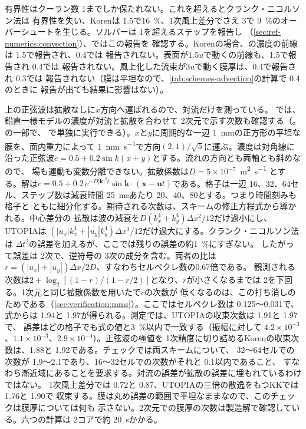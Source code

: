 有界性はクーラン数 1までしか保たれない。これを超えるとクランク・ニコルソン法は
有界性を失い、Korenは 1.5で\SI{16}{\percent}、1次風上差分でさえ 3で
\SI{9}{\percent}のオーバーシュートを生じる。ソルバーは 1を超えるステップを報告し
（\cref{sec:ref-numerics:convection}）、ではこの報告を
確認する。Korenの場合、の濃度の前線は 1.5で報告され、0.4では
報告されない。表面が$1.5u$で動くの前線も、1.5で報告され 0.4では
報告されない。風上化した流束が$3u$で動く膜厚は、0.4で報告され 0.3では
報告されない（膜は平坦なので、\cref{tab:schemes-advection}の計算で 0.4のときに
報告が出ても結果に影響はない）。

上の正弦波は拡散なしに$x$方向へ運ばれるので、対流だけを測っている。
では、鉛直一様モデルの濃度が対流と拡散を合わせて
2次元で示す次数も確認する（。の一部で、
で単独に実行できる）。$x$と$y$に周期的な一辺
\SI{1}{\milli\metre}の正方形の平坦な膜を、面内重力によって
\SI{1}{\milli\metre\per\second}で方向$(2,1)/\sqrt5$に運ぶ。濃度は対角線に
沿った正弦波$c = 0.5 + 0.2\sin k(x+y)$とする。流れの方向とも両軸とも斜めなので、
場も運動も変数分離できない。拡散係数は$D = 5\times10^{-7}$~\si{\metre\squared\per\second}
とする。解は$c = 0.5 + 0.2\,e^{-D|\mathbf k|^2t}\sin\mathbf
k\cdot(\mathbf x - \mathbf u t)$である。格子は一辺 16、32、64セル、ステップ数は減衰時間
\SI{25}{\milli\second}あたり 20、40、80とする。つまり時間刻みも格子と
ともに細分化する。期待される次数は、スキームの修正方程式から導かれる。中心差分の
拡散は波の減衰を$D(k_x^4+k_y^4)\Delta x^2/12$だけ過小にし、UTOPIAは
$(|u_x|k_x^4+|u_y|k_y^4)\Delta x^3/12$だけ過大にする。クランク・ニコルソン法は
$\Delta t^2$の誤差を加えるが、ここでは残りの誤差の約\SI{1}{\percent}にすぎない。
したがって誤差は 2次で、逆符号の 3次の成分を含む。両者の比は
$r = (|u_x|+|u_y|)\Delta x/2D$、すなわちセルペクレ数の$0.67$倍である。
観測される次数は$2 + \log_2[(1-r)/(1-r/2)]$となり、$r$が小さくなるまでは
2を下回る。1次元と同じ拡散係数を用いたで$c$の次数が
低くなるのは、この打ち消しのためである（\cref{sec:verification:mms}）。ここではセルペクレ数は
0.125～0.031で、式からは 1.94と 1.97が得られる。測定では、UTOPIAの収束次数は 1.91と 1.97で、
誤差はどの格子でも式の値と\SI{3}{\percent}以内で一致する（振幅に対して
$4.2\times10^{-3}$、$1.1\times10^{-3}$、$2.9\times10^{-4}$）。正弦波の極値を
1次精度に切り詰めるKorenの収束次数は、1.88と 1.92である。チェックでは両スキームについて、
32～64セルでの次数が 1.9～2.1であり、16～32セルでの次数がそれと 0.1以内であること、
すなわち漸近域にあることを要求する。対流の誤差が拡散の誤差に埋もれているわけではない。
1次風上差分では 0.72と 0.87、UTOPIAの三倍の散逸をもつKKでは 1.76と 1.90で
収束する。膜は丸め誤差の範囲で平坦なままなので、このチェックは膜厚については何も
示さない。2次元での膜厚の次数は製造解で確認している。六つの計算は 2コアで約
\SI{20}{\second}かかる。

